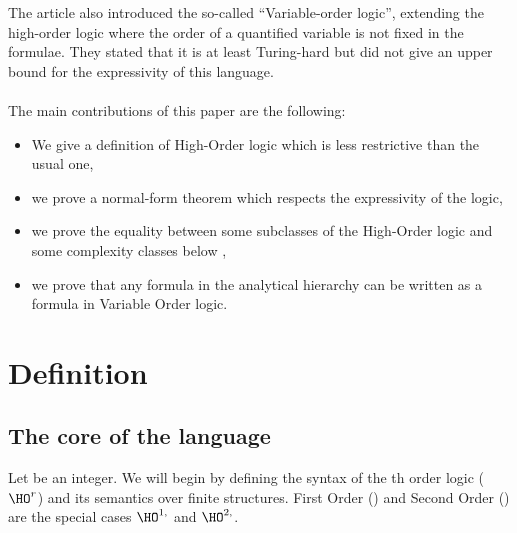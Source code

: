 \documentclass[a4paper,12pt]{article}
\theoremstyle{definition}
\newcommand{\hoa}[1]{\ensuremath{\HO^{#1}}}
\newcommand{\hod}[2]{\ensuremath{\HO^{#1,#2}}}
\begin{document}
The article \cite{lauri} also introduced the so-called ``Variable-order logic'',
extending the high-order logic where the order of a quantified
variable is not fixed in the formulae. They stated that it is at least
Turing-hard but did not give an upper bound for the expressivity of this
language.

\paragraph{}
The main contributions of this paper are the following:
\begin{itemize}
\item We give a definition of High-Order logic which is less
  restrictive than the usual one,
\item we prove a normal-form theorem which respects the expressivity of
  the logic,
\item we prove the equality between some subclasses of the High-Order
  logic and some complexity classes below \ELEMENTARY{},
\item we prove that any formula in the analytical hierarchy can be
  written as a formula in Variable Order logic.
\end{itemize}





\section{Definition}\label{def}

\subsection{The core of the language}
Let  be an integer. We will begin by defining the syntax of the
th order logic (\hoa r) and its semantics over finite
structures. First Order (\FO) and Second Order (\SO) are the special
cases \hod{1}{} and \hod{2}{}.
\end{document}
